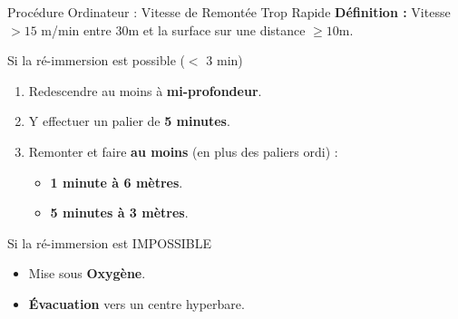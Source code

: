 \begin{frame}{Procédure Ordinateur : Vitesse de Remontée Trop Rapide}
    \small
    \textbf{Définition :} Vitesse $> 15$ m/min entre 30m et la surface sur une distance $\ge 10$m.

    \begin{block}{Si la ré-immersion est possible ($<$ 3 min)}
        \begin{enumerate}
            \item Redescendre au moins à \textbf{mi-profondeur}.
            \item Y effectuer un palier de \textbf{5 minutes}.
            \item Remonter et faire \textbf{au moins} (en plus des paliers ordi) :
            \begin{itemize}
                \item \textbf{1 minute à 6 mètres}.
                \item \textbf{5 minutes à 3 mètres}.
            \end{itemize}
        \end{enumerate}
    \end{block}

    \begin{alertblock}{Si la ré-immersion est IMPOSSIBLE}
        \begin{itemize}
            \item Mise sous \textbf{Oxygène}.
            \item \textbf{Évacuation} vers un centre hyperbare.
        \end{itemize}
    \end{alertblock}
\end{frame}
